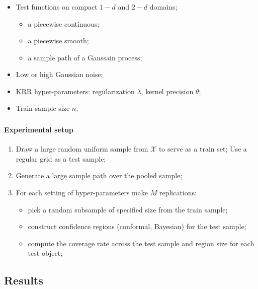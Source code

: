 \documentclass[t]{beamer}  %
\newcommand{\Xcal}{\mathcal{X}}
\begin{document}
\begin{frame}[t]\frametitle{\insertsection}
  \begin{itemize}
    \item Test functions on compact $1-d$ and $2-d$ domains; \begin{itemize}
      \item a piecewise continuous;
      \item a piecewise smooth;
      \item a sample path of a Gaussain process;
    \end{itemize}
    \item Low or high Gaussian noise;
    \item KRR hyper-parameters: regularization $\lambda$, kernel precision $\theta$;
    \item Train sample size $n$;
  \end{itemize}
\end{frame}

\begin{frame}[c]\frametitle{\insertsection}
  \framesubtitle{Experimental setup}
  \begin{enumerate}
    \item Draw a large random uniform sample from $\Xcal$ to serve as a train set;
      Use a regular grid as a test sample;
    \item Generate a large sample path over the pooled sample;
    \item For each setting of hyper-parameters make $M$ replications: \begin{itemize}
      \item pick a random subsample of specified size from the train sample;
      \item construct confidence regions (conformal, Bayesian) for the test sample;
      \item compute the coverage rate across the test sample and region size for each test object;
    \end{itemize}
  \end{enumerate}
\end{frame}

\subsection{Results} %
\label{sub:results}
\end{document}
